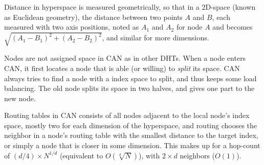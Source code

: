 Distance in hyperspace is measured geometrically, so that in a 2D-space (known as
 Euclidean geometry), the distance between two points $A$ and $B$, each measured with
 two axis positions, noted as $A_1$ and $A_2$ for node $A$ and becomes
   $\sqrt{(A_1-B_1)^2+(A_2-B_2)^2}$, and similar for more dimensions.

Nodes are not assigned space in CAN as in other DHTs. When a node enters CAN, it
 first locates a node that is able (or willing) to \emph{split} its space. CAN always
 tries to find a node with a  index space to split, and thus keeps some load balancing.
 The old node splits its space in two halves, and gives one part to the new node.

Routing tables in CAN consists of all nodes adjacent to the local node's index space,
 mostly two for each dimension of the hyperspace, and routing chooses the neighbor in a node's
 routing table with the smallest distance to the target index, or simply a node that is
 closer in some dimension. This makes up for a
 hop-count of $(d/4)\times N^{1/d}$ (equivalent to $O(\sqrt[d]{N})$), with $2\times{}d$
 neighbors ($O(1)$).

% 
% 
% 
% 

